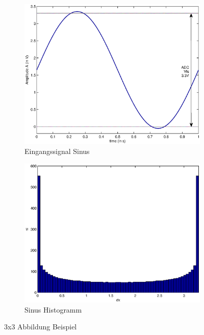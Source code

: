 \documentclass[SSS_Laborbericht.tex]{subfiles}
\begin{document}
\begin{figure}[!ht]
\begin{subfigure}{.499\textwidth}
		\label{fig:GRUNDL_SIN_HIST_3X3}	
	\end{subfigure}
	\begin{subfigure}{.499\textwidth}
		\centering\small
		\includegraphics[width=\textwidth]{media/matlab/HISTOGRAM/sin_fkt_samples_5000.eps}
		\caption{Eingangssignal Sinus}
		\label{fig:GRUNDL_SIN_SIN_A_3X3}
	\end{subfigure}%
	\begin{subfigure}{.499\textwidth}
		\centering\small
		\includegraphics[width=\textwidth]{media/matlab/HISTOGRAM/sin_hist_samples_5000.eps}
		\caption{Sinus Histogramm}
		\label{fig:GRUNDL_SIN_HIST_A_3X3}
	\end{subfigure}	
\caption{3x3 Abbildung Beispiel}
\label{fig:GRUNDL_RAMP_SIN_HIST}
\end{figure}
\newpage
\end{document}
